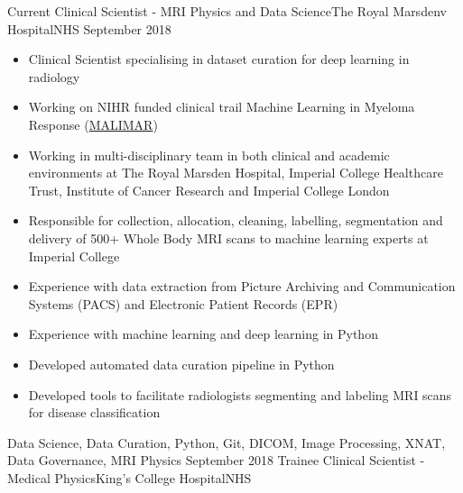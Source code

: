 %
%
%
\begin{experiences}
  \experience
    {Current}   {Clinical Scientist - MRI Physics and Data Science}{The Royal Marsdenv Hospital}{NHS}
    {September 2018} {
                      \begin{itemize}
                        \item Clinical Scientist specialising in dataset curation for deep learning in radiology
                        \item Working on NIHR funded clinical trail Machine Learning in Myeloma Response
                              ({\color{linkcolor}\href{https://fundingawards.nihr.ac.uk/award/16/68/34}{MALIMAR}})
                        \item Working in multi-disciplinary team in both clinical and academic environments at The Royal Marsden Hospital,
                        Imperial College Healthcare Trust, Institute of Cancer Research and Imperial College London
                        \item Responsible for collection, allocation, cleaning, labelling, segmentation and delivery of 500+
                        Whole Body MRI scans to machine learning experts at Imperial College
                        \item Experience with data extraction from Picture Archiving and Communication Systems (PACS) and
                        Electronic Patient Records (EPR)
                        \item Experience with machine learning and deep learning in Python
                        \item Developed automated data curation pipeline in Python
                        \item Developed tools to facilitate radiologists segmenting and labeling MRI scans for disease classification
                      \end{itemize}
                    }
                    {Data Science, Data Curation, Python, Git, DICOM, Image Processing, XNAT, Data Governance, MRI Physics}
  \emptySeparator
  \experience
    {September 2018} {Trainee Clinical Scientist - Medical Physics}{King's College Hospital}{NHS}

\end{experiences}
